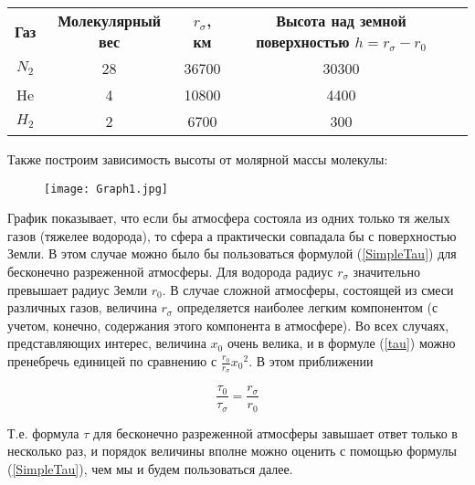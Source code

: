 \documentclass[a4paper,12pt]{article}
\begin{document}
\begin{table}[h!]

\begin{tabular}{|c|c|c|c|l}
\cline{1-4}
\textbf{Газ} & \textbf{Молекулярный вес} & \textbf{$r_{\sigma}$, км} & \textbf{Высота над земной поверхностью $h = r_{\sigma} - r_0$} &  \\ \cline{1-4}
$N_2$        & 28                        & 36700                     & 30300                                                          &  \\ \cline{1-4}
He           & 4                         & 10800                     & 4400                                                           &  \\ \cline{1-4}
$H_2$        & 2                         & 6700                      & 300                                                            &  \\ \cline{1-4}
\end{tabular}
\end{table}

Также построим зависимость высоты от молярной массы молекулы:

\begin{figure}[h!]
\texttt{[image: Graph1.jpg]}
\end{figure}

График показывает, что если бы атмосфера состояла из одних только тя­
желых газов (тяжелее водорода), то сфера а практически совпадала бы с поверхностью Земли. В этом случае можно было бы пользоваться формулой (\ref{SimpleTau}) для бесконечно разреженной атмосферы. Для водорода радиус $r_{\sigma}$ значительно превышает радиус Земли $r_0$. В случае сложной атмосферы, состоящей из смеси различных газов, величина $r_{\sigma}$ определяется наиболее легким компонентом (с учетом, конечно, содержания этого компонента в атмосфере). Во всех случаях, представ­ляющих интерес, величина $x_0$ очень велика, и в формуле (\ref{tau}) можно пре­небречь единицей по сравнению с $\frac{r_0}{r_{\sigma}}{x_0}^2$. В этом приближении

\begin{equation}\label{TauRad}
	\frac{\tau_0}{\tau_{\sigma}} = \frac{r_{\sigma}}{r_0}
\end{equation}

Т.е. формула $\tau$ для бесконечно разреженной атмосферы завышает ответ только в несколько раз, и порядок величины вполне можно оценить с помощью формулы (\ref{SimpleTau}), чем мы и будем пользоваться далее.
\end{document}
